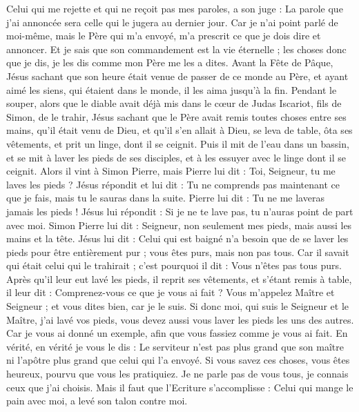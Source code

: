\begin{multicols}{2}
Celui qui me rejette et qui ne reçoit pas mes paroles, a son juge : La parole que j'ai annoncée sera celle qui le jugera au dernier jour.
Car je n'ai point parlé de moi-même, mais le Père qui m'a envoyé, m'a prescrit ce que je dois dire et annoncer.
Et je sais que son commandement est la vie éternelle ; les choses donc que je dis, je les dis comme mon Père me les a dites.
\VerseOne{}Avant la Fête de Pâque, Jésus sachant que son heure était venue de passer de ce monde au Père, et ayant aimé les siens, qui étaient dans le monde, il les aima jusqu'à la fin.
Pendant le souper, alors que le diable avait déjà mis dans le cœur de Judas Iscariot, fils de Simon, de le trahir,
Jésus sachant que le Père avait remis toutes choses entre ses mains, qu'il était venu de Dieu, et qu'il s'en allait à Dieu,
se leva de table, ôta ses vêtements, et prit un linge, dont il se ceignit.
Puis il mit de l'eau dans un bassin, et se mit à laver les pieds de ses disciples, et à les essuyer avec le linge dont il se ceignit.
Alors il vint à Simon Pierre, mais Pierre lui dit : Toi, Seigneur, tu me laves les pieds ?
Jésus répondit et lui dit : Tu ne comprends pas maintenant ce que je fais, mais tu le sauras dans la suite.
Pierre lui dit : Tu ne me laveras jamais les pieds ! Jésus lui répondit : Si je ne te lave pas, tu n'auras point de part avec moi.
Simon Pierre lui dit : Seigneur, non seulement mes pieds, mais aussi les mains et la tête.
Jésus lui dit : Celui qui est baigné n'a besoin que de se laver les pieds pour être entièrement pur ; vous êtes purs, mais non pas tous.
Car il savait qui était celui qui le trahirait ; c'est pourquoi il dit : Vous n'êtes pas tous purs.
Après qu'il leur eut lavé les pieds, il reprit ses vêtements, et s'étant remis à table, il leur dit : Comprenez-vous ce que je vous ai fait ?
Vous m'appelez Maître et Seigneur ; et vous dites bien, car je le suis.
Si donc moi, qui suis le Seigneur et le Maître, j'ai lavé vos pieds, vous devez aussi vous laver les pieds les uns des autres.
Car je vous ai donné un exemple, afin que vous fassiez comme je vous ai fait.
En vérité, en vérité je vous le dis : Le serviteur n'est pas plus grand que son maître ni l'apôtre plus grand que celui qui l'a envoyé.
Si vous savez ces choses, vous êtes heureux, pourvu que vous les pratiquiez.
Je ne parle pas de vous tous, je connais ceux que j'ai choisis. Mais il faut que l'Ecriture s'accomplisse : Celui qui mange le pain avec moi, a levé son talon contre moi.

\end{multicols}
